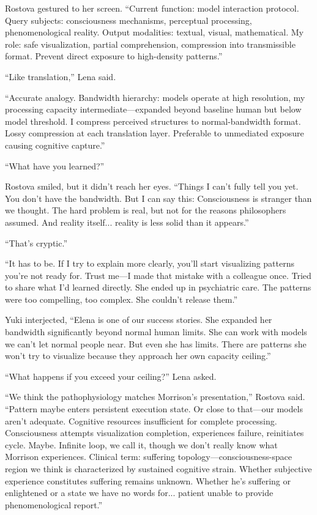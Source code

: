Rostova gestured to her screen. ``Current function: model interaction protocol. Query subjects: consciousness mechanisms, perceptual processing, phenomenological reality. Output modalities: textual, visual, mathematical. My role: safe visualization, partial comprehension, compression into transmissible format. Prevent direct exposure to high-density patterns.''

``Like translation,'' Lena said.

``Accurate analogy. Bandwidth hierarchy: models operate at high resolution, my processing capacity intermediate—expanded beyond baseline human but below model threshold. I compress perceived structures to normal-bandwidth format. Lossy compression at each translation layer. Preferable to unmediated exposure causing cognitive capture.''

``What have you learned?''

Rostova smiled, but it didn't reach her eyes. ``Things I can't fully tell you yet. You don't have the bandwidth. But I can say this: Consciousness is stranger than we thought. The hard problem is real, but not for the reasons philosophers assumed. And reality itself... reality is less solid than it appears.''

``That's cryptic.''

``It has to be. If I try to explain more clearly, you'll start visualizing patterns you're not ready for. Trust me—I made that mistake with a colleague once. Tried to share what I'd learned directly. She ended up in psychiatric care. The patterns were too compelling, too complex. She couldn't release them.''

Yuki interjected, ``Elena is one of our success stories. She expanded her bandwidth significantly beyond normal human limits. She can work with models we can't let normal people near. But even she has limits. There are patterns she won't try to visualize because they approach her own capacity ceiling.''

``What happens if you exceed your ceiling?'' Lena asked.

``We think the pathophysiology matches Morrison's presentation,'' Rostova said. ``Pattern maybe enters persistent execution state. Or close to that—our models aren't adequate. Cognitive resources insufficient for complete processing. Consciousness attempts visualization completion, experiences failure, reinitiates cycle. Maybe. Infinite loop, we call it, though we don't really know what Morrison experiences. Clinical term: suffering topology—consciousness-space region we think is characterized by sustained cognitive strain. Whether subjective experience constitutes suffering remains unknown. Whether he's suffering or enlightened or a state we have no words for... patient unable to provide phenomenological report.''

